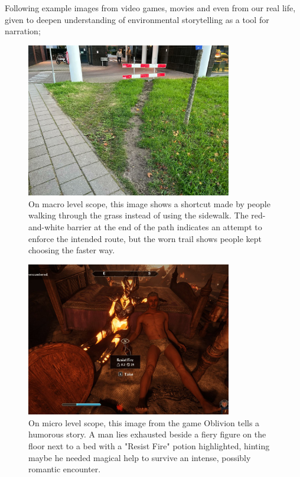     Following example images from video games, movies and even from our real life, given to deepen understanding of environmental storytelling as a tool for narration;

    \begin{figure}[H]
    \centering
    \includegraphics[width=0.8\textwidth]{images/environmental_storytelling_02}
    \caption{On macro level scope, this image shows a shortcut made by people walking through the grass instead of using the sidewalk. The red-and-white barrier at the end of the path indicates an attempt to enforce the intended route, but the worn trail shows people kept choosing the faster way.}
    \end{figure}

    \begin{figure}[H]
    \centering
    \includegraphics[width=0.8\textwidth]{images/environmental_storytelling_04}
    \caption{On micro level scope, this image from the game Oblivion tells a humorous story. A man lies exhausted beside a fiery figure on the floor next to a bed with a "Resist Fire" potion  highlighted, hinting maybe he needed magical help to survive an intense, possibly romantic encounter.}
    \end{figure}

